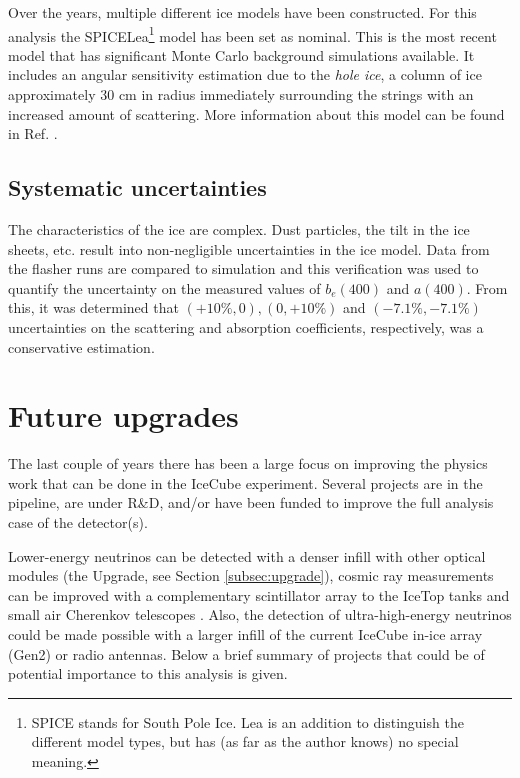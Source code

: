 Over the years, multiple different ice models have been constructed. For this analysis the SPICELea\footnote{SPICE stands for South Pole Ice. Lea is an addition to distinguish the different model types, but has (as far as the author knows) no special meaning.} model has been set as nominal. This is the most recent model that has significant Monte Carlo background simulations available. It includes an angular sensitivity estimation due to the \textit{hole ice}, a column of ice approximately 30 cm in radius immediately surrounding the strings with an increased amount of scattering. More information about this model can be found in Ref. \cite{1412998}.
\subsection{Systematic uncertainties}
The characteristics of the ice are complex. Dust particles, the tilt in the ice sheets, etc. result into non-negligible uncertainties in the ice model. Data from the flasher runs are compared to simulation and this verification was used to quantify the uncertainty on the measured values of $b_e(400)$ and $a(400)$. From this, it was determined that $(+10\%,0), (0,+10\%)$ and $(-7.1\%,-7.1\%)$ uncertainties on the scattering and absorption coefficients, respectively, was a conservative estimation.



\section{Future upgrades}
The last couple of years there has been a large focus on improving the physics work that can be done in the IceCube experiment. Several projects are in the pipeline, are under R\&D, and/or have been funded to improve the full analysis case of the detector(s).

Lower-energy neutrinos can be detected with a denser infill with other optical modules (the Upgrade, see Section \ref{subsec:upgrade}), cosmic ray measurements can be improved with a complementary scintillator array to the IceTop tanks \cite{Collaboration:2017tdy} and small air Cherenkov telescopes \cite{Auffenberg:2017vwc}. Also, the detection of ultra-high-energy neutrinos could be made possible with a larger infill of the current IceCube in-ice array (Gen2) or radio antennas. Below a brief summary of projects that could be of potential importance to this analysis is given.

